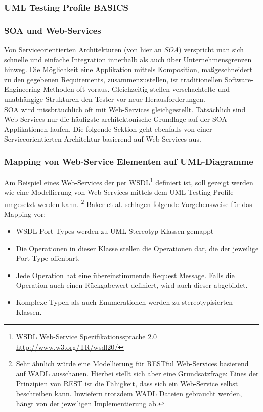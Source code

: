 \subsubsection{UML Testing Profile BASICS}

\subsubsection{SOA und Web-Services}
Von Serviceorientierten Architekturen (von hier an \textit{SOA}) verspricht man sich schnelle und einfache Integration innerhalb als auch über Unternehmensgrenzen hinweg. Die Möglichkeit eine Applikation mittels Komposition, maßgeschneidert zu den gegebenen Requirements, zusammenzustellen, ist traditionellen Software-Engineering Methoden oft voraus. Gleichzeitig stellen verschachtelte und unabhängige Strukturen den Tester vor neue Herausforderungen. \\
SOA wird missbräuchlich oft mit Web-Services gleichgestellt. Tatsächlich sind Web-Services nur die häufigste architektonische Grundlage auf der SOA-Applikationen laufen. Die folgende Sektion geht ebenfalls von einer Serviceorientierten Architektur basierend auf Web-Services aus.

\subsubsection{Mapping von Web-Service Elementen auf UML-Diagramme}
Am Beispiel eines Web-Services der per WSDL\footnote{WSDL Web-Service Spezifikationssprache 2.0 \url{http://www.w3.org/TR/wsdl20/}} definiert ist, soll gezeigt werden wie eine Modellierung von Web-Services mittels dem UML-Testing Profile umgesetzt werden kann. \footnote{Sehr ähnlich würde eine Modellierung für RESTful Web-Services basierend auf WADL ausschauen. Hierbei stellt sich aber eine Grundsatzfrage: Eines der Prinzipien von REST ist die Fähigkeit, dass sich ein Web-Service selbst beschreiben kann. Inwiefern trotzdem WADL Dateien gebraucht werden, hängt von der jeweiligen Implementierung ab.} Baker et al. schlagen folgende Vorgehensweise für das Mapping vor\cite{_model-driven_2007}:

\begin{itemize}
\item WSDL Port Types werden zu UML Stereotyp-Klassen gemappt
\item Die Operationen in dieser Klasse stellen die Operationen dar, die der jeweilige Port Type offenbart.
\item Jede Operation hat eine übereinstimmende Request Message. Falls die Operation auch einen Rückgabewert definiert, wird auch dieser abgebildet.
\item Komplexe Typen als auch Enumerationen werden zu stereotypisierten Klassen.
\end{itemize}

